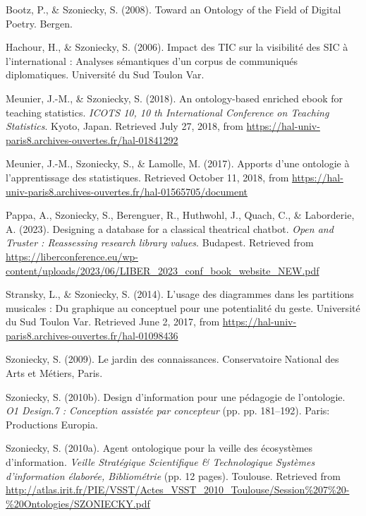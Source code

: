 \documentclass[
  a4paper,
  DIV=11,
  numbers=noendperiod]{scrreprt}
\newlength{\cslhangindent}
\newenvironment{CSLReferences}[2] %
 {\begin{list}{}{%
  \setlength{\itemindent}{0pt}
  \setlength{\leftmargin}{0pt}
  \setlength{\parsep}{0pt}
  \ifodd #1
   \setlength{\leftmargin}{\cslhangindent}
   \setlength{\itemindent}{-1\cslhangindent}
  \fi
  \setlength{\itemsep}{#2\baselineskip}}}
 {\end{list}}
\begin{document}
\label{refs-articleColloque}
\begin{CSLReferences}{1}{0}
Bootz, P., \& Szoniecky, S. (2008). Toward an {Ontology} of the {Field}
of {Digital} {Poetry}. Bergen.

Hachour, H., \& Szoniecky, S. (2006). Impact des {TIC} sur la visibilité
des {SIC} à l'international : Analyses sémantiques d'un corpus de
communiqués diplomatiques. Université du Sud Toulon Var.

Meunier, J.-M., \& Szoniecky, S. (2018). An ontology-based enriched
ebook for teaching statistics. \emph{{ICOTS} 10, 10 th {International}
{Conference} on {Teaching} {Statistics}}. Kyoto, Japan. Retrieved July
27, 2018, from
\url{https://hal-univ-paris8.archives-ouvertes.fr/hal-01841292}

Meunier, J.-M., Szoniecky, S., \& Lamolle, M. (2017). Apports d'une
ontologie à l'apprentissage des statistiques. Retrieved October 11,
2018, from
\url{https://hal-univ-paris8.archives-ouvertes.fr/hal-01565705/document}

Pappa, A., Szoniecky, S., Berenguer, R., Huthwohl, J., Quach, C., \&
Laborderie, A. (2023). Designing a database for a classical theatrical
chatbot. \emph{Open and {Truster} : {Reassessing} research library
values}. Budapest. Retrieved from
\url{https://liberconference.eu/wp-content/uploads/2023/06/LIBER_2023_conf_book_website_NEW.pdf}

Stransky, L., \& Szoniecky, S. (2014). L'usage des diagrammes dans les
partitions musicales : Du graphique au conceptuel pour une potentialité
du geste. Université du Sud Toulon Var. Retrieved June 2, 2017, from
\url{https://hal-univ-paris8.archives-ouvertes.fr/hal-01098436}

Szoniecky, S. (2009). Le jardin des connaissances. Conservatoire
National des Arts et Métiers, Paris.

Szoniecky, S. (2010b). Design d'information pour une pédagogie de
l'ontologie. \emph{O1 {Design}.7 : {Conception} assistée par concepteur}
(pp. pp. 181--192). Paris: Productions Europia.

Szoniecky, S. (2010a). Agent ontologique pour la veille des écosystèmes
d'information. \emph{Veille {Stratégique} {Scientifique} \&
{Technologique} {Systèmes} d'information élaborée, {Bibliométrie}} (pp.
12 pages). Toulouse. Retrieved from
\url{http://atlas.irit.fr/PIE/VSST/Actes_VSST_2010_Toulouse/Session\%207\%20-\%20Ontologies/SZONIECKY.pdf}


\end{CSLReferences}
\end{document}
